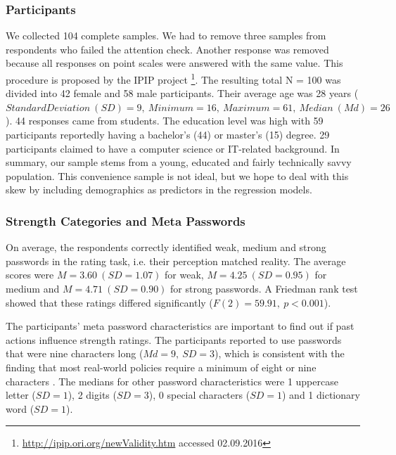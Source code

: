 \subsubsection{Participants}
We collected 104 complete samples. We had to remove three samples from respondents who failed the attention check. Another response was removed because all responses on point scales were answered with the same value. This procedure is proposed by the IPIP project \footnote{\url{http://ipip.ori.org/newValidity.htm} accessed 02.09.2016}. The resulting total N = 100 was divided into 42 female and 58 male participants. Their average age was 28 years ($Standard Deviation~(SD) = 9,~Minimum = 16,~Maximum = 61,~Median~(Md) = 26$). 44 responses came from students. The education level was high with 59 participants reportedly having a bachelor's (44) or master's (15) degree. 29 participants claimed to have a computer science or IT-related background. In summary, our sample stems from a young, educated and fairly technically savvy population. This convenience sample is not ideal, but we hope to deal with this skew by including demographics as predictors in the regression models.

\subsubsection{Strength Categories and Meta Passwords}
On average, the respondents correctly identified weak, medium and strong passwords in the rating task, i.e. their perception matched reality. The average scores were $M=3.60~(SD=1.07)$ for weak, $M=4.25~(SD=0.95)$ for medium and $M=4.71~(SD=0.90)$ for strong passwords. A Friedman rank test showed that these ratings differed significantly ($F(2)=59.91,~p < 0.001$). 

The participants' meta password characteristics are important to find out if past actions influence strength ratings. The participants reported to use passwords that were nine characters long ($Md=9,~SD=3$), which is consistent with the finding that most real-world policies require a minimum of eight or nine characters \cite{Wang2015EmperorsPolicies}. The medians for other password characteristics were 1 uppercase letter ($SD=1$), 2 digits ($SD=3$), 0 special characters ($SD=1$) and 1 dictionary word ($SD=1$).


